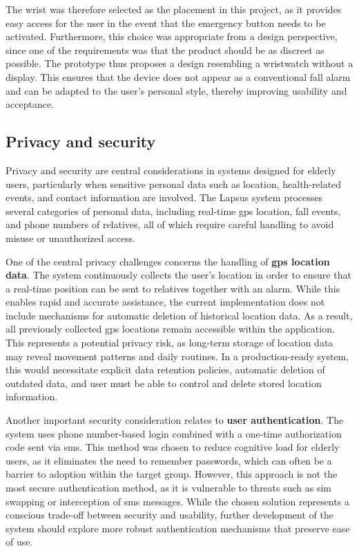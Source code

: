 The wrist was therefore selected as the placement in this project, as it provides easy access for the user in the event that the emergency button needs to be activated. Furthermore, this choice was appropriate from a design perspective, since one of the requirements was that the product should be as discreet as possible. The prototype thus proposes a design resembling a wristwatch without a display. This ensures that the device does not appear as a conventional fall alarm and can be adapted to the user’s personal style, thereby improving usability and acceptance.

\subsection{Privacy and security}
Privacy and security are central considerations in systems designed for elderly users, particularly when sensitive personal data such as location, health-related events, and contact information are involved. The Lapsus system processes several categories of personal data, including real-time \gls{gps} location, fall events, and phone numbers of relatives, all of which require careful handling to avoid misuse or unauthorized access.

One of the central privacy challenges concerns the handling of \textbf{\gls{gps} location data}. The system continuously collects the user’s location in order to ensure that a real-time position can be sent to relatives together with an alarm. While this enables rapid and accurate assistance, the current implementation does not include mechanisms for automatic deletion of historical location data. As a result, all previously collected \gls{gps} locations remain accessible within the application. This represents a potential privacy risk, as long-term storage of location data may reveal movement patterns and daily routines. In a production-ready system, this would necessitate explicit data retention policies, automatic deletion of outdated data, and user must be able to control and delete stored location information.

Another important security consideration relates to \textbf{user authentication}. The system uses phone number-based login combined with a one-time authorization code sent via \gls{sms}. This method was chosen to reduce cognitive load for elderly users, as it eliminates the need to remember passwords, which can often be a barrier to adoption within the target group. However, this approach is not the most secure authentication method, as it is vulnerable to threats such as \gls{sim} swapping or interception of \gls{sms} messages. While the chosen solution represents a conscious trade-off between security and usability, further development of the system should explore more robust authentication mechanisms that preserve ease of use.


